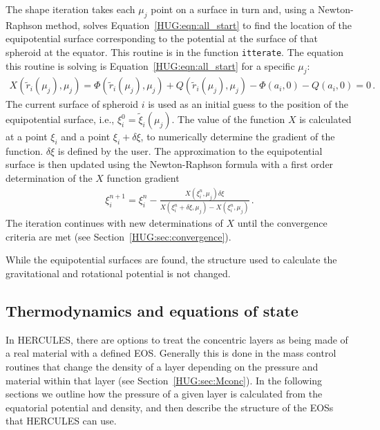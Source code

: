 \documentclass[11pt, oneside]{article}   	%
\begin{document}
The shape iteration takes each $\mu_j$ point on a surface in turn and, using a Newton-Raphson method, solves Equation~\ref{HUG:eqn:all_start} to find the location of the equipotential surface corresponding to the potential at the surface of that spheroid at the equator.
This routine is in the function \texttt{itterate}.
The equation this routine is solving is Equation~\ref{HUG:eqn:all_start} for a specific $\mu_j$:
%
\begin{align}
 X(\tilde{r}_i(\mu_j), \mu_j)= \Phi(\tilde{r}_i(\mu_j), \mu_j) + Q(\tilde{r}_i(\mu_j), \mu_j)-\Phi(a_i,0) - Q(a_i,0) = 0 \, .
 \end{align}
%
The current surface of spheroid $i$ is used as an initial guess to the position of the equipotential surface, i.e., $\xi_i^0=\tilde{\xi}_i(\mu_j)$.
The value of the function $X$ is calculated at a point $\xi_i$ and a point $\xi_i+\delta\xi$, to numerically determine the gradient of the function. $\delta\xi$ is defined by the user.
The approximation to the equipotential surface is then updated using the Newton-Raphson formula with a first order determination of the $X$ function gradient
%
\begin{align}
\xi_i^{n+1}=\xi_i^n-\frac{X(\xi_i^n, \mu_j) \delta\xi}{X(\xi_i^n+\delta\xi, \mu_j)-X(\xi_i^n, \mu_j)} \, .
\end{align}
%
The iteration continues with new determinations of $X$ until the convergence criteria are met (see Section~\ref{HUG:sec:convergence}).


\vspace{0.5cm}
\begin{tcolorbox}[colback=white, colframe=SchoolColor, title=Note]
While the equipotential surfaces are found, the structure used to calculate the gravitational and rotational potential is not changed. 
\end{tcolorbox}


\subsection{Thermodynamics and equations of state}
\label{HUG:sec:thermo}

In HERCULES, there are options to treat the concentric layers as being made of a real material with a defined EOS. 
Generally this is done in the mass control routines that change the density of a layer depending on the pressure and material within that layer (see Section~\ref{HUG:sec:Mconc}).
In the following sections we outline how the pressure of a given layer is calculated from the equatorial potential and density, and then describe the structure of the EOSs that HERCULES can use. 
\end{document}
